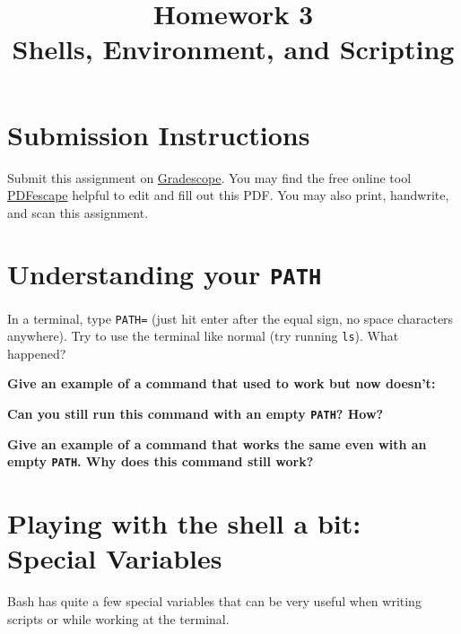 \documentclass{article}
\begin{document}
\fancyhead[L]{}
\fancyhead[R]{}

\fancyfoot[C]{\color{gray} \thepage~/~\pageref*{LastPage}}
\pagestyle{fancyplain}

\title{\textbf{Homework 3\\Shells, Environment, and Scripting}}
\author{\textbf{\color{red}{Due: Wednesday, January 31st, 11:59PM (Hard Deadline)}}}
\date{}
\maketitle


\section*{Submission Instructions}
Submit this assignment on \href{https://gradescope.com/courses/13649}{Gradescope}.
You may find the free online tool \href{https://www.pdfescape.com}{PDFescape}
helpful to edit and fill out this PDF.
You may also print, handwrite, and scan this assignment.


\section{Understanding your \texttt{PATH}}

In a terminal, type \texttt{PATH=} (just hit enter after the equal sign, no
space characters anywhere). Try to use the terminal like normal (try running
\texttt{ls}). What happened?

\textbf{Give an example of a command that used to work but now doesn't:}
\vspace{1.5cm}

\textbf{Can you still run this command with an empty \texttt{PATH}? How?}
\vspace{1.5cm}

\textbf{Give an example of a command that works the same even with an empty
\texttt{PATH}. Why does this command still work?}
\vspace{1.5cm}


\section{Playing with the shell a bit: Special Variables}

Bash has quite a few special variables that can be very useful when writing
scripts or while working at the terminal.
\end{document}
